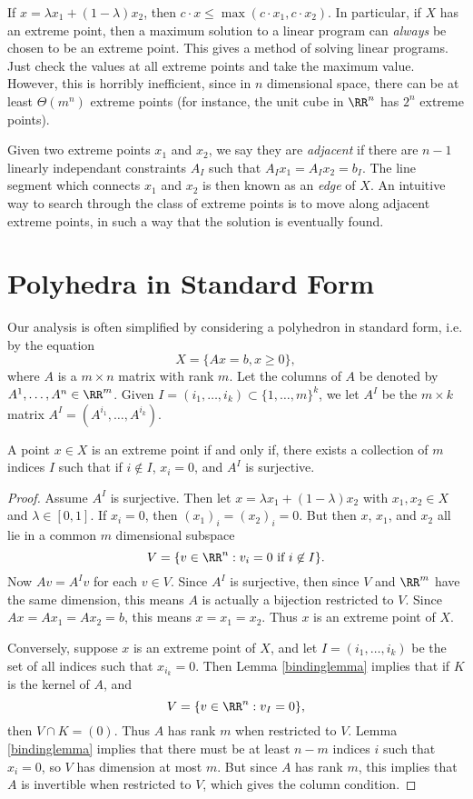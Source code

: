 If $x = \lambda x_1 + (1 - \lambda) x_2$, then $c \cdot x \leq \max(c \cdot x_1, c \cdot x_2)$. In particular, if $X$ has an extreme point, then a maximum solution to a linear program can \emph{always} be chosen to be an extreme point. This gives a method of solving linear programs. Just check the values at all extreme points and take the maximum value. However, this is horribly inefficient, since in $n$ dimensional space, there can be at least $\Theta(m^n)$ extreme points (for instance, the unit cube in $\RR^n$ has $2^n$ extreme points).

Given two extreme points $x_1$ and $x_2$, we say they are \emph{adjacent} if there are $n-1$ linearly independant constraints $A_I$ such that $A_I x_1 = A_I x_2 = b_I$. The line segment which connects $x_1$ and $x_2$ is then known as an \emph{edge} of $X$. An intuitive way to search through the class of extreme points is to move along adjacent extreme points, in such a way that the solution is eventually found.

\section{Polyhedra in Standard Form}

Our analysis is often simplified by considering a polyhedron in standard form, i.e. by the equation
%
\[ X = \{ Ax = b, x \geq 0 \}, \]
%
where $A$ is a $m \times n$ matrix with rank $m$. Let the columns of $A$ be denoted by $A^1, \dots, A^n \in \RR^m$. Given $I = (i_1, \dots, i_k) \subset \{ 1, \dots, m \}^k$, we let $A^I$ be the $m \times k$ matrix $A^I = (A^{i_1}, \dots, A^{i_k})$.

\begin{lemma}
    A point $x \in X$ is an extreme point if and only if, there exists a collection of $m$ indices $I$ such that if $i \not \in I$, $x_i = 0$, and $A^I$ is surjective.
\end{lemma}
\begin{proof}
    Assume $A^I$ is surjective. Then let $x = \lambda x_1 + (1 - \lambda)x_2$ with $x_1,x_2 \in X$ and $\lambda \in [0,1]$. If $x_i = 0$, then $(x_1)_i = (x_2)_i = 0$. But then $x$, $x_1$, and $x_2$ all lie in a common $m$ dimensional subspace
    \[ V = \{ v \in \RR^n: v_i = 0\ \text{if}\ i \not \in I \}. \]
    Now $Av = A^Iv$ for each $v \in V$. Since $A^I$ is surjective, then since $V$ and $\RR^m$ have the same dimension, this means $A$ is actually a bijection restricted to $V$. Since $A x = A x_1 = A x_2 = b$, this means $x = x_1 = x_2$. Thus $x$ is an extreme point of $X$.

    Conversely, suppose $x$ is an extreme point of $X$, and let $I = (i_1, \dots, i_k)$ be the set of all indices such that $x_{i_k} = 0$. Then Lemma \ref{bindinglemma} implies that if $K$ is the kernel of $A$, and
    \[ V = \{ v \in \RR^n : v_I = 0 \}, \]
    then $V \cap K = (0)$. Thus $A$ has rank $m$ when restricted to $V$. Lemma \ref{bindinglemma} implies that there must be at least $n - m$ indices $i$ such that $x_i = 0$, so $V$ has dimension at most $m$. But since $A$ has rank $m$, this implies that $A$ is invertible when restricted to $V$, which gives the column condition.
\end{proof}

